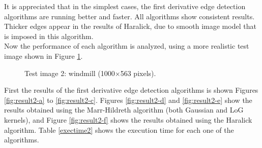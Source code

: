 \documentclass{ipol}
\numberwithin{equation}{section}
\numberwithin{table}{section}
\numberwithin{figure}{section}
\begin{document}
It is appreciated that in the simplest cases, the first derivative edge detection algorithms are running better and faster. All algorithms show consistent results. Thicker edges appear in the results of Haralick, due to smooth image model that is imposed in this algorithm. \\

Now the performance of each algorithm is analyzed, using a more realistic test image shown in Figure \ref{fig:original2}. \\

\begin{figure}[t!]
	\centering
	\quad
	\caption{Test image 2: windmill (1000$\times$563 pixels).}
	\label{fig:original2}
\end{figure}

First the results of the first derivative edge detection algorithms is shown Figures \ref{fig:result2-a} to \ref{fig:result2-c}. Figures \ref{fig:result2-d} and \ref{fig:result2-e} show the results obtained using the Marr-Hildreth algorithm (both Gaussian and LoG kernels), and Figure \ref{fig:result2-f} shows the results obtained using the Haralick algorithm. Table \ref{exectime2} shows the execution time for each one of the algorithms. \\
\end{document}
